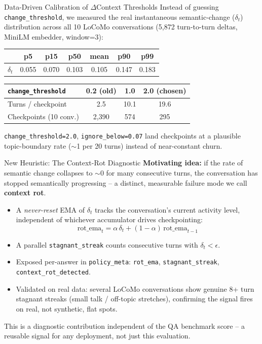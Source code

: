 \documentclass[aspectratio=169]{beamer}
\begin{document}
\begin{frame}{Data-Driven Calibration of $\Delta$Context Thresholds}
    Instead of guessing \texttt{change\_threshold}, we measured the real instantaneous semantic-change ($\delta_t$) distribution across all 10 LoCoMo conversations (5{,}872 turn-to-turn deltas, MiniLM embedder, window=3):

    \begin{table}
    \centering
    \small
    \begin{tabular}{lcccccc}
    \toprule
    & p5 & p15 & p50 & mean & p90 & p99 \\
    \midrule
    $\delta_t$ & 0.055 & 0.070 & 0.103 & 0.105 & 0.147 & 0.183 \\
    \bottomrule
    \end{tabular}
    \end{table}

    \begin{table}
    \centering
    \small
    \begin{tabular}{lccc}
    \toprule
    \texttt{change\_threshold} & 0.2 (old) & 1.0 & 2.0 (chosen) \\
    \midrule
    Turns / checkpoint & 2.5 & 10.1 & 19.6 \\
    Checkpoints (10 conv.) & 2{,}390 & 574 & 295 \\
    \bottomrule
    \end{tabular}
    \end{table}
    \texttt{change\_threshold=2.0}, \texttt{ignore\_below=0.07} land checkpoints at a plausible topic-boundary rate ($\sim$1 per 20 turns) instead of near-constant churn.
\end{frame}

\begin{frame}{New Heuristic: The Context-Rot Diagnostic}
    \textbf{Motivating idea:} if the rate of semantic change collapses to $\sim$0 for many consecutive turns, the conversation has stopped semantically progressing -- a distinct, measurable failure mode we call \textbf{context rot}.

    \begin{itemize}
        \item A \emph{never-reset} EMA of $\delta_t$ tracks the conversation's current activity level, independent of whichever accumulator drives checkpointing:
        \[ \text{rot\_ema}_t = \alpha \, \delta_t + (1-\alpha)\, \text{rot\_ema}_{t-1} \]
        \item A parallel \texttt{stagnant\_streak} counts consecutive turns with $\delta_t < \epsilon$.
        \item Exposed per-answer in \texttt{policy\_meta}: \texttt{rot\_ema}, \texttt{stagnant\_streak}, \texttt{context\_rot\_detected}.
        \item Validated on real data: several LoCoMo conversations show genuine 8+ turn stagnant streaks (small talk / off-topic stretches), confirming the signal fires on real, not synthetic, flat spots.
    \end{itemize}
    \small This is a diagnostic contribution independent of the QA benchmark score -- a reusable signal for any deployment, not just this evaluation.
\end{frame}
\end{document}
